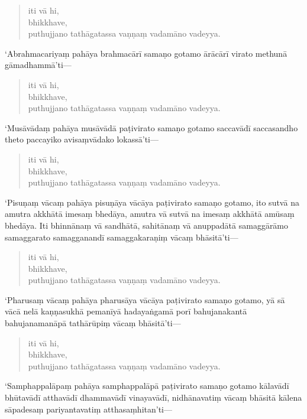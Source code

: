 \documentclass[11pt,twoside,openright]{book}
\begin{document}
\begin{verse}
iti vā hi,\\
\vin  bhikkhave,\\
\vin  puthujjano tathāgatassa vaṇṇaṃ vadamāno vadeyya.

\end{verse}
\pstart
‘Abrahmacariyaṃ pahāya brahmacārī samaṇo gotamo ārācārī virato methunā gāmadhammā’ti—
\pend

\begin{verse}
iti vā hi,\\
\vin  bhikkhave,\\
\vin  puthujjano tathāgatassa vaṇṇaṃ vadamāno vadeyya.

\end{verse}
\pstart
‘Musāvādaṃ pahāya musāvādā paṭivirato samaṇo gotamo saccavādī saccasandho theto paccayiko avisaṃvādako lokassā’ti—
\pend

\begin{verse}
iti vā hi,\\
\vin  bhikkhave,\\
\vin  puthujjano tathāgatassa vaṇṇaṃ vadamāno vadeyya.

\end{verse}
\pstart
‘Pisuṇaṃ vācaṃ pahāya pisuṇāya vācāya paṭivirato samaṇo gotamo, ito sutvā na amutra akkhātā imesaṃ bhedāya, amutra vā sutvā na imesaṃ akkhātā amūsaṃ bhedāya. Iti bhinnānaṃ vā sandhātā, sahitānaṃ vā anuppadātā samaggārāmo samaggarato samagganandī samaggakaraṇiṃ vācaṃ bhāsitā’ti—
\pend

\begin{verse}
iti vā hi,\\
\vin  bhikkhave,\\
\vin  puthujjano tathāgatassa vaṇṇaṃ vadamāno vadeyya.

\end{verse}
\pstart
‘Pharusaṃ vācaṃ pahāya pharusāya vācāya paṭivirato samaṇo gotamo, yā sā vācā nelā kaṇṇasukhā pemanīyā hadayaṅgamā porī bahujanakantā bahujanamanāpā tathārūpiṃ vācaṃ bhāsitā’ti—
\pend

\begin{verse}
iti vā hi,\\
\vin  bhikkhave,\\
\vin  puthujjano tathāgatassa vaṇṇaṃ vadamāno vadeyya.

\end{verse}
\pstart
‘Samphappalāpaṃ pahāya samphappalāpā paṭivirato samaṇo gotamo kālavādī bhūtavādī atthavādī dhammavādī vinayavādī, nidhānavatiṃ vācaṃ bhāsitā kālena sāpadesaṃ pariyantavatiṃ atthasaṃhitan’ti—
\pend
\end{document}
